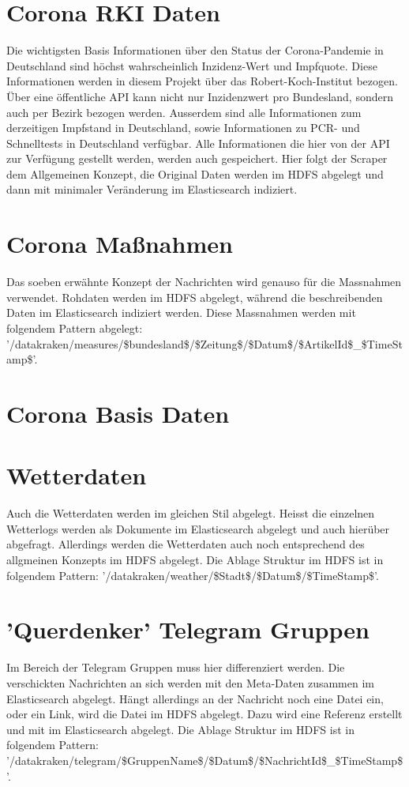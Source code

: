 \documentclass[12pt,twoside,a4paper,parskip]{scrbook}
\begin{document}
\section{Corona RKI Daten}
Die wichtigsten Basis Informationen \"uber den Status der Corona-Pandemie in Deutschland sind h\"ochst wahrscheinlich Inzidenz-Wert und Impfquote. Diese Informationen werden in diesem Projekt \"uber das Robert-Koch-Institut bezogen. \"Uber eine \"offentliche API kann nicht nur Inzidenzwert pro Bundesland, sondern auch per Bezirk bezogen werden. Ausserdem sind alle Informationen zum derzeitigen Impfstand in Deutschland, sowie Informationen zu PCR- und Schnelltests in Deutschland verf\"ugbar. Alle Informationen die hier von der API zur Verf\"ugung gestellt werden, werden auch gespeichert. Hier folgt der Scraper dem Allgemeinen Konzept, die Original Daten werden im HDFS abgelegt und dann mit minimaler Ver\"anderung im Elasticsearch indiziert.
\section{Corona Maßnahmen}
Das soeben erw\"ahnte Konzept der Nachrichten wird genauso f\"ur die Massnahmen verwendet. Rohdaten werden im HDFS abgelegt, w\"ahrend die beschreibenden Daten im Elasticsearch indiziert werden. Diese Massnahmen werden mit folgendem Pattern abgelegt: '/datakraken/measures/\$bundesland\$/\$Zeitung\$/\$Datum\$/\$ArtikelId\$\_\$TimeStamp\$'.
\section{Corona Basis Daten}
\section{Wetterdaten}
Auch die Wetterdaten werden im gleichen Stil abgelegt. Heisst die einzelnen Wetterlogs werden als Dokumente im Elasticsearch abgelegt und auch hier\"uber abgefragt. Allerdings werden die Wetterdaten auch noch entsprechend des allgmeinen Konzepts im HDFS abgelegt. Die Ablage Struktur im HDFS ist in folgendem Pattern:  '/datakraken/weather/\$Stadt\$/\$Datum\$/\$TimeStamp\$'.
\section{'Querdenker' Telegram Gruppen}
Im Bereich der Telegram Gruppen muss hier differenziert werden. Die verschickten Nachrichten an sich werden mit den Meta-Daten zusammen im Elasticsearch abgelegt. H\"angt allerdings an der Nachricht noch eine Datei ein, oder ein Link, wird die Datei im HDFS abgelegt. Dazu wird eine Referenz erstellt und mit im Elasticsearch abgelegt. Die Ablage Struktur im HDFS ist in folgendem Pattern: '/datakraken/telegram/\$GruppenName\$/\$Datum\$/\$NachrichtId\$\_\$TimeStamp\$'.
\end{document}
